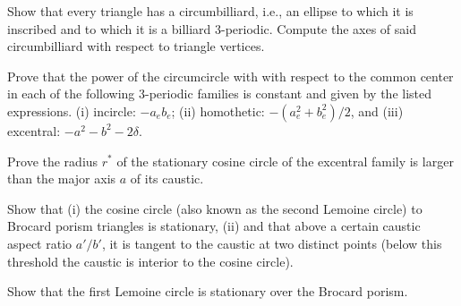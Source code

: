 \begin{exercise}
\label{ex:03-circumbilliard} 
Show that every triangle has a circumbilliard, i.e., an ellipse to which it is inscribed and to which it is a billiard 3-periodic. Compute the axes of said circumbilliard with respect to triangle vertices. 
\end{exercise}
 
\begin{exercise}
 \label{ex:03-power-euler} 
Prove that the power of the circumcircle with with respect to the common center in each of the following 3-periodic families is constant and given by the listed expressions. (i) incircle: $-a_e b_e$; (ii) homothetic: $-({a_e^2+b_e^2})/{2}$, and (iii) excentral: $-a^2-b^2-2\delta$. 
\end{exercise}



\begin{exercise}
\label{ex:03-cosine-circle}
Prove the radius $r^*$ of the stationary cosine circle of the excentral family is larger than the major axis $a$ of its caustic. 
\end{exercise}

\begin{exercise}
Show that (i) the cosine circle (also known as the second Lemoine circle) to Brocard porism triangles is stationary, (ii) and that above a certain caustic aspect ratio $a'/b'$, it is tangent to the caustic at two distinct points (below this threshold the caustic is interior to the cosine circle).
\end{exercise}

\begin{exercise}
Show that the first Lemoine circle is stationary over the Brocard porism.
\end{exercise}

